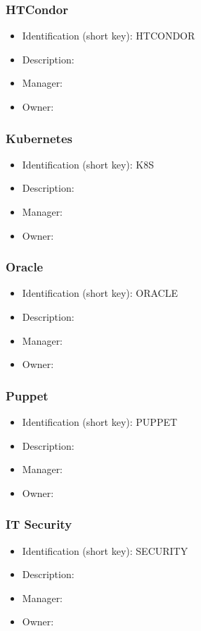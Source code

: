\subsubsection{HTCondor}\label{sect:HTCONDOR}
\begin{itemize}
\item Identification (short key): HTCONDOR
\item Description: 
\item Manager: 
\item Owner: 
\end{itemize}

\subsubsection{Kubernetes}\label{sect:K8S}
\begin{itemize}
\item Identification (short key): K8S
\item Description: 
\item Manager: 
\item Owner: 
\end{itemize}

\subsubsection{Oracle}\label{sect:ORACLE}
\begin{itemize}
\item Identification (short key): ORACLE
\item Description: 
\item Manager: 
\item Owner: 
\end{itemize}

\subsubsection{Puppet}\label{sect:PUPPET}
\begin{itemize}
\item Identification (short key): PUPPET
\item Description: 
\item Manager: 
\item Owner: 
\end{itemize}

\subsubsection{IT Security}\label{sect:SECURITY}
\begin{itemize}
\item Identification (short key): SECURITY
\item Description: 
\item Manager: 
\item Owner: 
\end{itemize}

